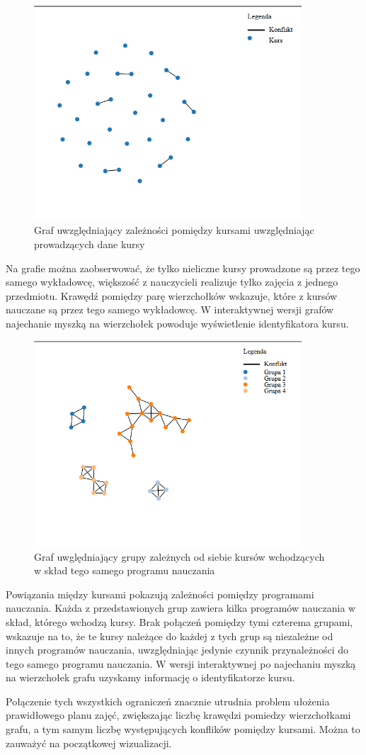 \begin{figure}[H]
  \caption{Graf uwzględniający zależności pomiędzy kursami uwzględniając prowadzących dane kursy}
  \centering
    \includegraphics[width=10cm]{test1_teach.PNG}
\end{figure}
Na grafie można zaobserwować, że tylko nieliczne kursy prowadzone są przez tego samego wykładowcę, większość z nauczycieli realizuje tylko zajęcia z jednego przedmiotu. Krawędź pomiędzy parę wierzchołków wskazuje, które z kursów nauczane są przez tego samego wykładowcę. W interaktywnej wersji grafów najechanie myszką na wierzchołek powoduje wyświetlenie identyfikatora kursu.
\begin{figure}[H]
  \caption{Graf uwględniający grupy zależnych od siebie kursów wchodzących w skład tego samego programu nauczania}
  \centering
    \includegraphics[width=10cm]{test1_con.PNG}
\end{figure}
\par Powiązania między kursami pokazują zależności pomiędzy programami nauczania. Każda z przedstawionych grup zawiera kilka programów nauczania w skład, którego wchodzą kursy. Brak połączeń pomiędzy tymi czterema grupami, wskazuje na to, że te kursy należące do każdej z tych grup są niezależne od innych programów nauczania, uwzględniając jedynie czynnik przynależności do tego samego programu nauczania. W wersji interaktywnej po najechaniu myszką na wierzchołek grafu uzyskamy informację o identyfikatorze kursu.
\par Połączenie tych wszystkich ograniczeń znacznie utrudnia problem ułożenia prawidłowego planu zajęć, zwiększając liczbę krawędzi pomiedzy wierzchołkami grafu, a tym samym liczbę występujących konflików pomiędzy kursami. Można to zauważyć na początkowej wizualizacji.


